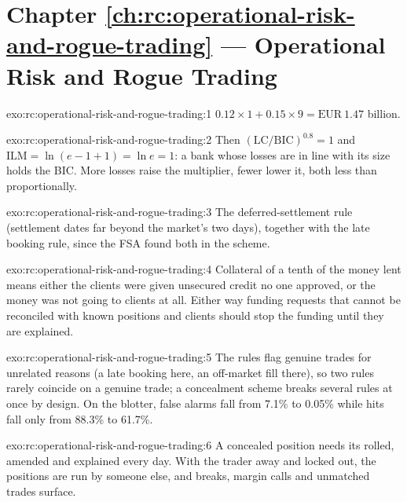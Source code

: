 \section*{Chapter \ref{ch:rc:operational-risk-and-rogue-trading} --- Operational Risk and Rogue Trading}

\begin{solution}{exo:rc:operational-risk-and-rogue-trading:1}
$0.12\times1+0.15\times9 = \text{EUR}~1.47$ billion.
\end{solution}

\begin{solution}{exo:rc:operational-risk-and-rogue-trading:2}
Then $(\mathrm{LC}/\mathrm{BIC})^{0.8}=1$ and $\mathrm{ILM}=\ln(e-1+1)=\ln e=1$: a bank whose losses are in line with its
size holds the BIC. More losses raise the multiplier, fewer lower it, both less than proportionally.
\end{solution}

\begin{solution}{exo:rc:operational-risk-and-rogue-trading:3}
The deferred-settlement rule (settlement dates far beyond the market's two days), together with the late
booking rule, since the FSA found both in the scheme.
\end{solution}

\begin{solution}{exo:rc:operational-risk-and-rogue-trading:4}
Collateral of a tenth of the money lent means either the clients were given unsecured credit no one
approved, or the money was not going to clients at all. Either way funding requests that cannot be
reconciled with known positions and clients should stop the funding until they are explained.
\end{solution}

\begin{solution}{exo:rc:operational-risk-and-rogue-trading:5}
The rules flag genuine trades for unrelated reasons (a late booking here, an off-market fill there), so
two rules rarely coincide on a genuine trade; a concealment scheme breaks several rules at once by design.
On the blotter, false alarms fall from 7.1\% to 0.05\% while hits fall only from 88.3\% to 61.7\%.
\end{solution}

\begin{solution}{exo:rc:operational-risk-and-rogue-trading:6}
A concealed position needs its  rolled, amended and explained every day. With the trader
away and locked out, the positions are run by someone else, and breaks, margin calls and unmatched trades
surface.
\end{solution}

